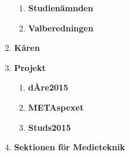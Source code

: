 \documentclass{dagordning}
\begin{document}
\begin{enumerate}
\begin{enumerate}
        \item \textbf{Studienämnden}
        \item \textbf{Valberedningen} 
      \end{enumerate}
    \item \textbf{Kåren}
    \item \textbf{Projekt}
      \begin{enumerate}
        \item \textbf{dÅre2015}
        \item \textbf{METAspexet}
        \item \textbf{Studs2015}
      \end{enumerate}
    \item \textbf{Sektionen för Medieteknik}
  \end{enumerate}










\end{document}
